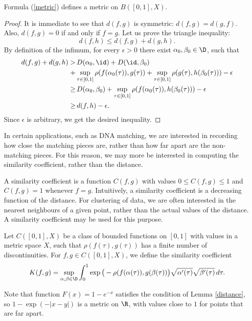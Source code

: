 \documentclass[12pt]{amsart}
\begin{document}
\begin{proposition}
\label{Hmetric}
Formula (\ref{metric}) defines a metric on $B([0,1], X)$.
\end{proposition}
\begin{proof}
It is immediate to see that $d(f, g)$ is symmetric: $d(f,g) = d(g,f)$. Also, $d(f,g) = 0$ if and only if $f = g$.
Let us prove the triangle inequality:
\[d(f,h) \leq d(f,g) + d(g,h).\]
By definition of the infimum, for every $\epsilon > 0$ there exist $\alpha_0, \beta_0 \in \D$, such that 
\begin{align*}
d(f,g) + d(g,h) > &\, D(\alpha_0, \id) + D(\id, \beta_0) \\
+ &\sup_{\tau \in [0,1]} \rho(f(\alpha_0(\tau)), g(\tau))
+ \sup_{\tau \in [0,1]} \rho(g(\tau), h(\beta_0(\tau))) - \epsilon \\
\geq & \, D(\alpha_0, \beta_0) + \sup_{\tau \in [0,1]} \rho(f(\alpha_0(\tau)), h(\beta_0(\tau))) - \epsilon \\
\geq & \, d(f,h) - \epsilon.
\end{align*}
Since $\epsilon$ is arbitrary, we get the desired inequality.
\end{proof}

In certain applications, such as DNA matching, we are interested in recording how close the matching pieces are, rather than how far apart are the non-matching pieces. For this reason, we may more be interested in computing the similarity coefficient, rather than the distance. 

A similarity coefficient is a function $C(f, g)$ with values $0 \leq C(f,g) \leq 1$ and $C(f, g) = 1$ whenever $f = g$. Intuitively, a similarity coefficient is a decreasing function of the distance.
 For clustering of data, we are often interested in the nearest neighbours of a given point, rather than the actual values of the distance. A similarity coefficient may be used for this purpose. 

Let $C([0,1], X)$ be a class of bounded functions on $[0,1]$ with values in a metric space $X$, such that $\rho(f(\tau), g(\tau))$ has a finite number of discontinuities. 
For $f, g \in C([0,1], X)$, we define the similarity coefficient
\[K (f, g) = \sup_{\alpha, \beta \in \D} \int_0^1 \exp\big(-\rho(f(\alpha(\tau)), g(\beta(\tau))\big) \sqrt{\alpha^\prime(\tau)} \sqrt{\beta^\prime(\tau)} \,d\tau.\]

Note that function $F(x) = 1 - e^{-x}$ satisfies the condition of Lemma \ref{distance}, so $1 - \exp(-|x-y|)$ is a metric on $\R$, with values close to $1$ for points that are far apart.
\end{document}
